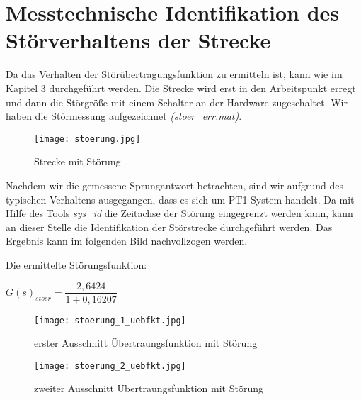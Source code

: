 
\newpage
[Perkowski]
\section{Messtechnische Identifikation des Störverhaltens der Strecke}
Da das Verhalten der Störübertragungsfunktion zu ermitteln ist, kann wie im Kapitel 3 durchgeführt werden. Die Strecke wird erst in den Arbeitspunkt erregt und dann die Störgröße mit einem Schalter an der Hardware zugeschaltet. Wir haben die Störmessung aufgezeichnet \textit{(stoer\_err.mat)}.

\begin{figure}[h]
	\begin{center}
		\texttt{[image: stoerung.jpg]}
		\caption{Strecke mit Störung}
       \label{stoer}
	\end{center} 
\end{figure}

Nachdem wir die gemessene Sprungantwort betrachten, sind wir aufgrund des typischen Verhaltens ausgegangen, dass es sich um PT1-System handelt. 
Da mit Hilfe des Tools \textit{sys\_id} die Zeitachse der Störung eingegrenzt werden kann, kann an dieser Stelle die Identifikation der Störstrecke durchgeführt werden. Das Ergebnis kann im folgenden Bild nachvollzogen werden.

Die ermittelte Störungsfunktion:

\begin{center}
$ G(s)_{stoer} = \dfrac{2,6424}{1 + 0,16207} $
\end{center}

\begin{figure}[h]
	\begin{center}
		\texttt{[image: stoerung\_1\_uebfkt.jpg]}
		\caption{erster Ausschnitt Übertraungsfunktion mit Störung}
       \label{stoerfkt1}
	\end{center} 
\end{figure}

\begin{figure}[h]
	\begin{center}
		\texttt{[image: stoerung\_2\_uebfkt.jpg]}
		\caption{zweiter Ausschnitt Übertraungsfunktion mit Störung}
       \label{stoerfkt2}
	\end{center} 
\end{figure}

